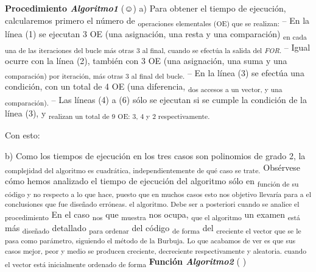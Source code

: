 \documentclass[12pt]{article}
\renewcommand{\_}{\kern-1.5pt\textunderscore\kern-1.5pt}
\begin{document}
\begin{justify}
{\fontsize{10pt}{12.0pt}\selectfont \textbf{Procedimiento \textit{Algoritmo1 }}(☺) a) Para obtener el tiempo de ejecución, calcularemos primero el número de \textsubscript{operaciones elementales (OE) que se realizan: }– En la línea (1) se ejecutan 3 OE (una asignación, una resta y una comparación) \textsubscript{en cada una de las iteraciones del bucle más otras 3 al final, cuando se efectúa la salida del \textit{FOR}. }– Igual ocurre con la línea (2), también con 3 OE (una asignación, una suma y una \textsubscript{comparación) por iteración, más otras 3 al final del bucle. }– En la línea (3) se efectúa una condición, con un total de 4 OE (una diferencia, \textsubscript{dos accesos a un vector, y una comparación). }– Las líneas (4) a (6) sólo se ejecutan si se cumple la condición de la línea (3), y \textsubscript{realizan un total de 9 OE: 3, 4 y 2 respectivamente. }\par}
\end{justify}\par

{\fontsize{10pt}{12.0pt}\selectfont Con esto: \par}\par

\begin{justify}
{\fontsize{10pt}{12.0pt}\selectfont b) Como los tiempos de ejecución en los tres casos son polinomios de grado 2, la \textsubscript{complejidad del algoritmo es cuadrática, independientemente de qué caso se trate. }Obsérvese cómo hemos analizado el tiempo de ejecución del algoritmo sólo en \textsubscript{función de su código y no respecto a lo que hace, puesto que en muchos casos esto nos objetivo llevaría para a el conclusiones que fue diseñado erróneas. el algoritmo. Debe ser a posteriori cuando se analice el procedimiento }En el caso \textsubscript{nos }que \textsubscript{muestra }nos ocupa, \textsubscript{que el algoritmo }un examen \textsubscript{está }más \textsubscript{diseñado }detallado \textsubscript{para ordenar }del código \textsubscript{de forma }del \textsubscript{creciente el vector que se le pasa como parámetro, siguiendo el método de la Burbuja. Lo que acabamos de ver es que sus casos mejor, peor y medio se producen creciente, decreciente respectivamente y aleatoria. cuando el vector está inicialmente ordenado de forma }\textbf{Función \textit{Algoritmo2 }}( ) \par}
\end{justify}\par
\end{document}
